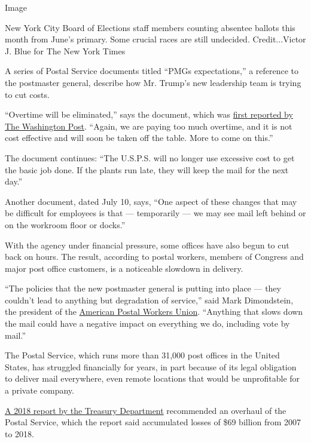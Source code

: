 Image

New York City Board of Elections staff members counting absentee ballots
this month from June's primary. Some crucial races are still undecided.
Credit...Victor J. Blue for The New York Times

A series of Postal Service documents titled ``PMGs expectations,'' a
reference to the postmaster general, describe how Mr. Trump's new
leadership team is trying to cut costs.

``Overtime will be eliminated,'' says the document, which was
\href{https://www.washingtonpost.com/business/2020/07/14/postal-service-trump-dejoy-delay-mail/}{first
reported by The Washington Post}. ``Again, we are paying too much
overtime, and it is not cost effective and will soon be taken off the
table. More to come on this.''

The document continues: ``The U.S.P.S. will no longer use excessive cost
to get the basic job done. If the plants run late, they will keep the
mail for the next day.''

Another document, dated July 10, says, ``One aspect of these changes
that may be difficult for employees is that --- temporarily --- we may
see mail left behind or on the workroom floor or docks.''

With the agency under financial pressure, some offices have also begun
to cut back on hours. The result, according to postal workers, members
of Congress and major post office customers, is a noticeable slowdown in
delivery.

``The policies that the new postmaster general is putting into place ---
they couldn't lead to anything but degradation of service,'' said Mark
Dimondstein, the president of the
\href{https://www.apwu.org/mark-dimondstein}{American Postal Workers
Union}. ``Anything that slows down the mail could have a negative impact
on everything we do, including vote by mail.''

The Postal Service, which runs more than 31,000 post offices in the
United States, has struggled financially for years, in part because of
its legal obligation to deliver mail everywhere, even remote locations
that would be unprofitable for a private company.

\href{https://home.treasury.gov/system/files/136/USPS_A_Sustainable_Path_Forward_report_12-04-2018.pdf}{A
2018 report by the Treasury Department} recommended an overhaul of the
Postal Service, which the report said accumulated losses of \$69 billion
from 2007 to 2018.

